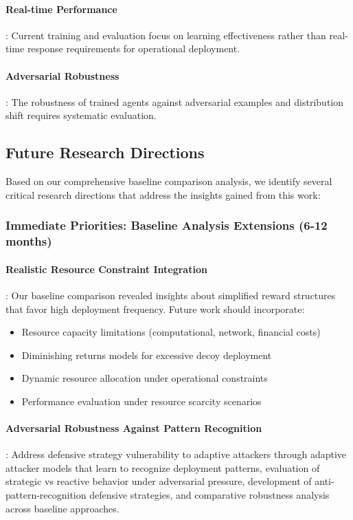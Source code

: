 \documentclass[12pt,oneside]{article}
\begin{document}
\paragraph{Real-time Performance}: Current training and evaluation focus on learning effectiveness rather than real-time response requirements for operational deployment.

\paragraph{Adversarial Robustness}: The robustness of trained agents against adversarial examples and distribution shift requires systematic evaluation.

\subsection{Future Research Directions}

Based on our comprehensive baseline comparison analysis, we identify several critical research directions that address the insights gained from this work:

\subsubsection{Immediate Priorities: Baseline Analysis Extensions (6-12 months)}

\paragraph{Realistic Resource Constraint Integration}: Our baseline comparison revealed insights about simplified reward structures that favor high deployment frequency. Future work should incorporate:
\begin{itemize}
\item Resource capacity limitations (computational, network, financial costs)
\item Diminishing returns models for excessive decoy deployment
\item Dynamic resource allocation under operational constraints
\item Performance evaluation under resource scarcity scenarios
\end{itemize}

\paragraph{Adversarial Robustness Against Pattern Recognition}: Address defensive strategy vulnerability to adaptive attackers through adaptive attacker models that learn to recognize deployment patterns, evaluation of strategic vs reactive behavior under adversarial pressure, development of anti-pattern-recognition defensive strategies, and comparative robustness analysis across baseline approaches.
\end{document}
